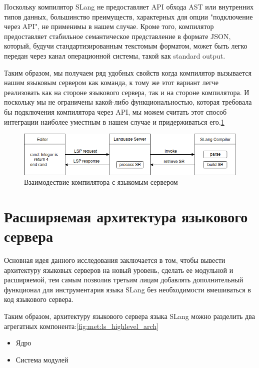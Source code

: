 Поскольку компилятор SLang\cite{Zouev2017} не предоставляет API обхода AST или внутренних типов данных, большинство преимуществ, 
характерных для опции "подключение через API", не применимы в нашем случае. 
Кроме того, компилятор предоставляет стабильное семантическое представление в формате JSON, который, 
будучи стандартизированным текстомым форматом, может быть легко передан через канал операционной системы, такой как standard output\cite{TheOpenGroup1997}.

Таким образом, мы получаем ряд удобных свойств когда компилятор вызывается нашим языковым сервером как команда, к тому же
этот вариант легче реализовать как на стороне языкового сервера, так и на стороне компилятора. 
И поскольку мы не ограничены какой-либо функциональностью, которая требовала бы подключения компилятора через API, 
мы можем считать этот способ интеграции наиболее уместным в нашем случае и придерживаться его.\ref{fig:met:compiler_integration}
\begin{figure}[H]
    \centering
    \includegraphics[width=1.0\textwidth]{figs/compiler_integration.png}
    \caption{Взаимодествие компилятора с языкомым сервером}
    \label{fig:met:compiler_integration}
\end{figure}

\section{Расширяемая архитектура языкового сервера}
\label{sec:met:arch}
Основная идея данного исследования заключается в том, чтобы вывести архитектуру языковых серверов на новый уровень, сделать ее модульной и расширяемой, 
тем самым позволив третьим лицам добавлять дополнительный функционал для инструментария языка SLang без необходимости вмешиваться в код языкового сервера.

Таким образом, архитектуру языкового сервера языка SLang можно разделить два агрегатных компонента:\ref{fig:met:ls_highlevel_arch}
\begin{itemize}
    \item Ядро
    \item Система модулей
\end{itemize}

